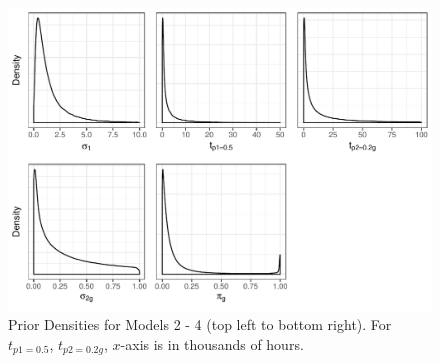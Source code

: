 \documentclass[12pt]{article}
\begin{document}
\begin{figure}[H]
\center
\includegraphics[width=\textwidth]{priormod234.pdf}
\caption{Prior Densities for Models 2 - 4 (top left to bottom right). For $t_{p1 = 0.5}$, $t_{p2 = 0.2g}$, $x$-axis is in thousands of hours.}
\end{figure}
\end{document}
